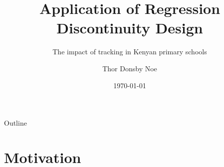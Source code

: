 \documentclass[9pt]{beamer}
\title{Application of Regression Discontinuity Design}
\subtitle{The impact of tracking in Kenyan primary schools}
\date{\today}
\author{Thor Donsby Noe}
\institute{Analysis \& Evaluation of Public Policies}
\numberwithin{equation}{section}
\begin{document}
\maketitle


\begin{frame}{Outline}
  \tableofcontents

\end{frame}


\section{Motivation}
\end{document}
